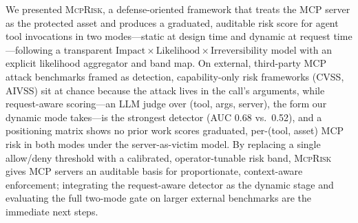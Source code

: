\documentclass[conference]{IEEEtran}
\newcommand{\framework}{\textsc{McpRisk}}
\begin{document}
We presented \framework, a defense-oriented framework that treats the MCP server
as the protected asset and produces a graduated, auditable risk score for agent
tool invocations in two modes---static at design time and dynamic at request time
---following a transparent
$\text{Impact}\times\text{Likelihood}\times\text{Irreversibility}$ model with an
explicit likelihood aggregator and band map. On external, third-party MCP attack
benchmarks framed as detection, capability-only risk frameworks (CVSS, AIVSS) sit
at chance because the attack lives in the call's arguments, while request-aware
scoring---an LLM judge over (tool, args, server), the form our dynamic mode
takes---is the strongest detector (AUC 0.68 vs.\ 0.52), and a positioning matrix
shows no prior work scores graduated, per-(tool, asset) MCP risk in both modes under
the server-as-victim model. By replacing a single allow/deny threshold with a
calibrated, operator-tunable risk band, \framework{} gives MCP servers an auditable
basis for proportionate, context-aware enforcement; integrating the request-aware
detector as the dynamic stage and evaluating the full two-mode gate on larger
external benchmarks are the immediate next steps.

\balance


\end{document}
